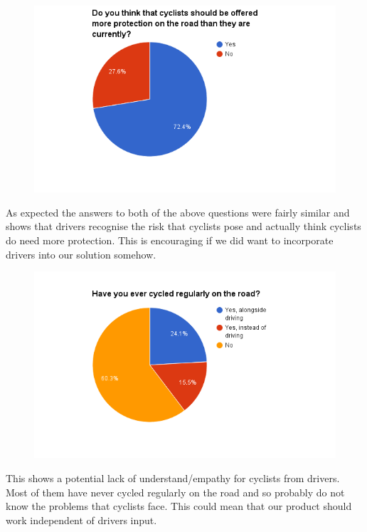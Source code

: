 \documentclass[a4paper]{report}
\begin{document}
{\begin{figure}[H]
\end{figure}
\begin{figure}[H]
\centering
\includegraphics[scale=0.6]{figures/research_report/questionnaires/cars_4}
\end{figure}
As expected the answers to both of the above questions were fairly similar and shows that drivers recognise the risk that cyclists pose and actually think cyclists do need more protection. This is encouraging if we did want to incorporate drivers into our solution somehow.
\begin{figure}[H]
\centering
\includegraphics[scale=0.6]{figures/research_report/questionnaires/cars_5}
\end{figure}
This shows a potential lack of understand/empathy for cyclists from drivers. Most of them have never cycled regularly on the road and so probably do not know the problems that cyclists face. This could mean that our product should work independent of drivers input. 

\newpage
}
\end{document}
